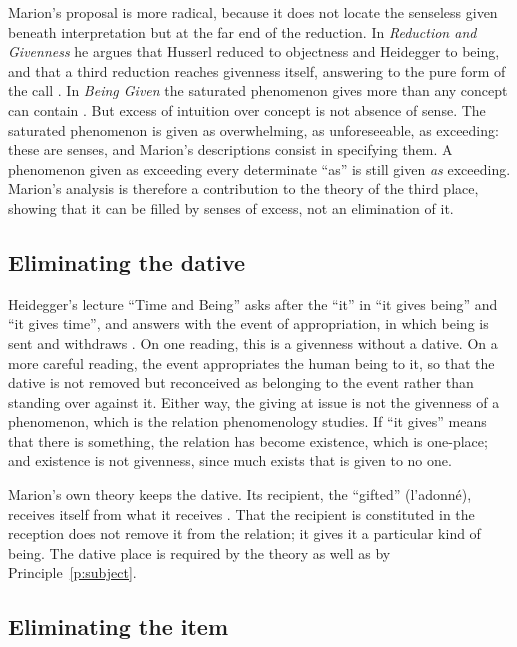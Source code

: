 \documentclass{situationist-preprint}
\begin{document}
Marion's proposal is more radical, because it does not locate the senseless given beneath interpretation but at the far end of the reduction. In \emph{Reduction and Givenness} he argues that Husserl reduced to objectness and Heidegger to being, and that a third reduction reaches givenness itself, answering to the pure form of the call \citep{Marion1989}. In \emph{Being Given} the saturated phenomenon gives more than any concept can contain \citep{Marion1997}. But excess of intuition over concept is not absence of sense. The saturated phenomenon is given as overwhelming, as unforeseeable, as exceeding: these are senses, and Marion's descriptions consist in specifying them. A phenomenon given as exceeding every determinate \enquote{as} is still given \emph{as} exceeding. Marion's analysis is therefore a contribution to the theory of the third place, showing that it can be filled by senses of excess, not an elimination of it.

\subsection{Eliminating the dative}

Heidegger's lecture \enquote{Time and Being} asks after the \enquote{it} in \enquote{it gives being} and \enquote{it gives time}, and answers with the event of appropriation, in which being is sent and withdraws \citep{Heidegger1969}. On one reading, this is a givenness without a dative. On a more careful reading, the event appropriates the human being to it, so that the dative is not removed but reconceived as belonging to the event rather than standing over against it. Either way, the giving at issue is not the givenness of a phenomenon, which is the relation phenomenology studies. If \enquote{it gives} means that there is something, the relation has become existence, which is one-place; and existence is not givenness, since much exists that is given to no one.

Marion's own theory keeps the dative. Its recipient, the \enquote{gifted} (l'adonné), receives itself from what it receives \citep{Marion1997}. That the recipient is constituted in the reception does not remove it from the relation; it gives it a particular kind of being. The dative place is required by the theory as well as by Principle~\ref{p:subject}.

\subsection{Eliminating the item}
\end{document}
